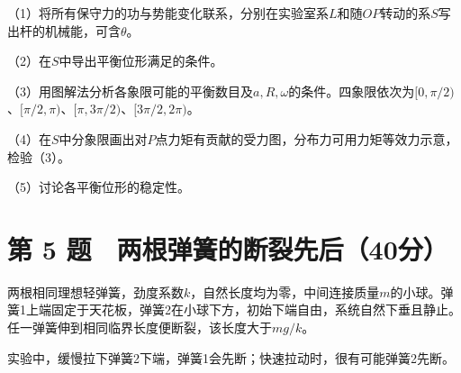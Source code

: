 \documentclass[12pt,a4paper,fontset=fandol]{ctexart}
\begin{document}
\begin{center}
\begin{minipage}{\linewidth}
\centering\begingroup{}
\ifdim\wd\diagrambox>.88\linewidth
\sbox{\diagrambox}{\resizebox{.88\linewidth}{!}{\usebox{\diagrambox}}}\fi
\ifdim\ht\diagrambox>.20\textheight
\resizebox{!}{.20\textheight}{\usebox{\diagrambox}}
\else\usebox{\diagrambox}\fi
\par{}\endgroup\end{minipage}\end{center}

（1）将所有保守力的功与势能变化联系，分别在实验室系\(L\)和随\(OP\)转动的系\(S\)写出杆的机械能，可含\(\theta\)。

（2）在\(S\)中导出平衡位形满足的条件。

（3）用图解法分析各象限可能的平衡数目及\(a,R,\omega\)的条件。四象限依次为\([0,\pi/2)\)、\([\pi/2,\pi)\)、\([\pi,3\pi/2)\)、\([3\pi/2,2\pi)\)。

（4）在\(S\)中分象限画出对\(P\)点力矩有贡献的受力图，分布力可用力矩等效力示意，检验（3）。

（5）讨论各平衡位形的稳定性。

\clearpage

\section{第 5
题　两根弹簧的断裂先后（40分）}\label{ux7b2c-5-ux9898-ux4e24ux6839ux5f39ux7c27ux7684ux65adux88c2ux5148ux540e40ux5206}

两根相同理想轻弹簧，劲度系数\(k\)，自然长度均为零，中间连接质量\(m\)的小球。弹簧1上端固定于天花板，弹簧2在小球下方，初始下端自由，系统自然下垂且静止。任一弹簧伸到相同临界长度便断裂，该长度大于\(mg/k\)。

实验中，缓慢拉下弹簧2下端，弹簧1会先断；快速拉动时，很有可能弹簧2先断。
\end{document}
